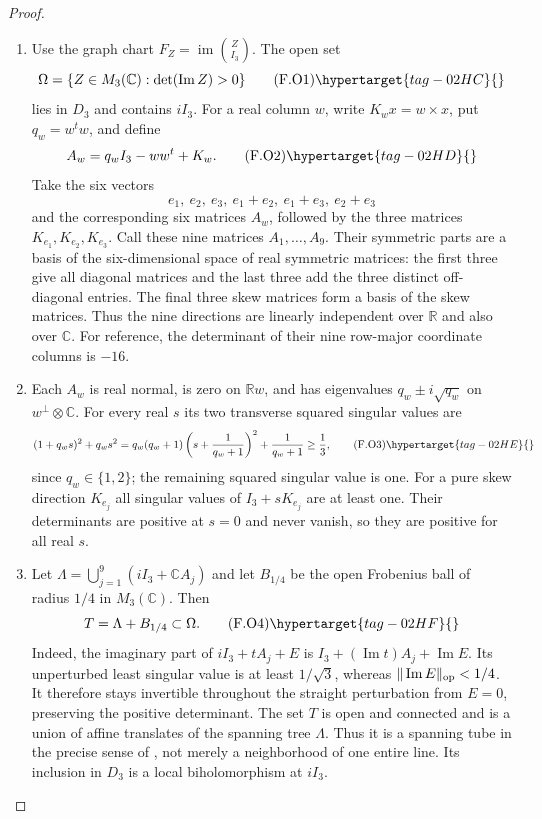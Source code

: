 \begin{proof}
\begin{enumerate}[label={$\langle1\rangle$\arabic*.}]
\item Use the graph chart $F_Z=\operatorname{im}\binom Z{I_3}$.
The open set
\[
 \Omega=\{Z\in M_3(\mathbb C):\det(\operatorname{Im}Z)>0\}
 \tag{F.O1}\hypertarget{tag-02HC}{}\label{maps:eq:F.O1}
\]
lies in $D_3$ and contains $iI_3$.  For a real column $w$, write
$K_w x=w\times x$, put $q_w=w^tw$, and define
\[
 A_w=q_wI_3-ww^t+K_w.
 \tag{F.O2}\hypertarget{tag-02HD}{}\label{maps:eq:F.O2}
\]
Take the six vectors
\[
 e_1,\ e_2,\ e_3,\ e_1+e_2,\ e_1+e_3,\ e_2+e_3
\]
and the corresponding six matrices $A_w$, followed by the three
matrices $K_{e_1},K_{e_2},K_{e_3}$.  Call these nine matrices
$A_1,\ldots,A_9$.  Their symmetric parts are a basis of the
six-dimensional space of real symmetric matrices: the first three
give all diagonal matrices and the last three add the three distinct
off-diagonal entries.  The final three skew matrices form a basis
of the skew matrices.  Thus the nine directions are linearly
independent over $\mathbb R$ and also over $\mathbb C$.
For reference, the determinant of their nine row-major coordinate
columns is $-16$.

\item Each $A_w$ is real normal, is zero on $\mathbb Rw$, and has
eigenvalues $q_w\pm i\sqrt{q_w}$ on $w^\perp\otimes\mathbb C$.
For every real $s$ its two transverse squared singular values are
\[
 (1+q_ws)^2+q_ws^2
 =q_w(q_w+1)\left(s+\frac1{q_w+1}\right)^2
       +\frac1{q_w+1}\ge\frac13,
 \tag{F.O3}\hypertarget{tag-02HE}{}\label{maps:eq:F.O3}
\]
since $q_w\in\{1,2\}$; the remaining squared singular value is one.
For a pure skew direction $K_{e_j}$ all singular values of
$I_3+sK_{e_j}$ are at least one.  Their determinants are positive
at $s=0$ and never vanish, so they are positive for all real $s$.

\item Let $\Lambda=\bigcup_{j=1}^9(iI_3+\mathbb C A_j)$ and let
$B_{1/4}$ be the open Frobenius ball of radius $1/4$ in
$M_3(\mathbb C)$.  Then
\[
 T=\Lambda+B_{1/4}\subset\Omega.
 \tag{F.O4}\hypertarget{tag-02HF}{}\label{maps:eq:F.O4}
\]
Indeed, the imaginary part of $iI_3+tA_j+E$ is
$I_3+(\operatorname{Im}t)A_j+\operatorname{Im}E$.
Its unperturbed least singular value is at least $1/\sqrt3$,
whereas $\|\operatorname{Im}E\|_{\rm op}<1/4$.
It therefore stays invertible throughout the straight perturbation
from $E=0$, preserving the positive determinant.
The set $T$ is open and connected and is a union of affine
translates of the spanning tree $\Lambda$.  Thus it is a spanning
tube in the precise sense of \cite[Definition 2.1, p.~4]{IVVOkaOneV5},
not merely a neighborhood of one entire line.  Its inclusion in
$D_3$ is a local biholomorphism at $iI_3$.


\end{enumerate}
\end{proof}
